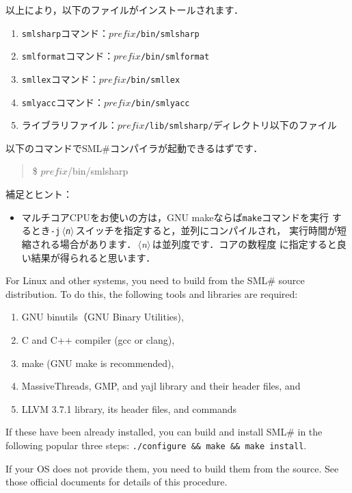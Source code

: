 \documentclass{jbook}
\newcommand{\smlsharp}{SML\#}
\newcommand{\nonterm}[1]{\mbox{$\,\langle$}{\it #1}\mbox{$\rangle\,$}}
\newenvironment{program}{\begin{quote}\begin{tt}}%
                        {\end{tt}\end{quote}}
\begin{document}
	以上により，以下のファイルがインストールされます．
\begin{enumerate}
\item {\tt smlsharp}コマンド：{\tt $\mathit{prefix}$/bin/smlsharp}
\item {\tt smlformat}コマンド：{\tt $\mathit{prefix}$/bin/smlformat}
\item {\tt smllex}コマンド：{\tt $\mathit{prefix}$/bin/smllex}
\item {\tt smlyacc}コマンド：{\tt $\mathit{prefix}$/bin/smlyacc}
\item ライブラリファイル：{\tt $\mathit{prefix}$/lib/smlsharp/}ディレクトリ以下のファイル
\end{enumerate}
以下のコマンドで\smlsharp{}コンパイラが起動できるはずです．
\begin{program}
\$ $\mathit{prefix}$/bin/smlsharp
\end{program}

補足とヒント：
\begin{itemize}
\item マルチコアCPUをお使いの方は，GNU makeならば{\tt make}コマンドを実行
するとき{\tt -j\nonterm{n}}スイッチを指定すると，並列にコンパイルされ，
実行時間が短縮される場合があります．\nonterm{n}は並列度です．コアの数程度
に指定すると良い結果が得られると思います．
\end{itemize}

\else%
	For Linux and other systems, you need to build from the
\smlsharp{} source distribution.
	To do this, the following tools and libraries are required:
\begin{enumerate}
\item GNU binutils（GNU Binary Utilities),
\item C and C++ compiler (gcc or clang),
\item make (GNU make is recommended),
\item MassiveThreads, GMP, and yajl library and their header files, and
\item LLVM 3.7.1 library, its header files, and commands
\end{enumerate}
	If these have been already installed, you can build and install
\smlsharp{} in the following popular three steps:
{\tt ./configure \&\& make \&\& make install}.

	If your OS does not provide them, you need to build them from the
source.
	See those official documents for details of this procedure.
\end{document}
